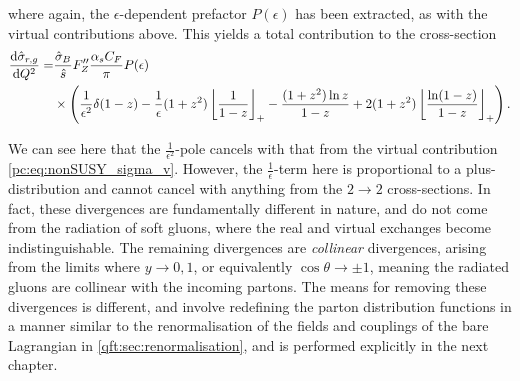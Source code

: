 \documentclass[../main.tex]{subfiles}
\begin{document}
where again, the \(\epsilon\)-dependent prefactor \(P(\epsilon)\) has been extracted, as with the virtual contributions above.
This yields a total contribution to the cross-section
\begin{align}
  \label{pc:eq:sigma_rg}
  \nonumber
  \d[Q^2]{\hat\sigma_{r,g}} = & \frac{\hat\sigma_B}{\hat{s}}  F^{\prime\prime}_Z \frac{\alpha_s C_F}{\pi} P(\epsilon)                                                                                        \\
                              & \times \pclosed{\frac{1}{\epsilon^2} \delta(1-z) - \frac{1}{\epsilon} (1+z^2)\plusdist{\frac{1}{1-z}} - \frac{(1+z^2)\ln z}{1-z} + 2(1+z^2)\plusdist{\frac{\ln(1-z)}{1-z}}}.
\end{align}

We can see here that the \(\frac{1}{\epsilon^2}\)-pole cancels with that from the virtual contribution \cref{pc:eq:nonSUSY_sigma_v}.
However, the \(\frac{1}{\epsilon}\)-term here is proportional to a plus-distribution and cannot cancel with anything from the \(2\to 2\) cross-sections.
In fact, these divergences are fundamentally different in nature, and do not come from the radiation of soft gluons, where the real and virtual exchanges become indistinguishable.
The remaining divergences are \emph{collinear} divergences, arising from the limits where \(y \to 0, 1\), or equivalently \(\cos\theta \to \pm 1\), meaning the radiated gluons are collinear with the incoming partons.
The means for removing these divergences is different, and involve redefining the parton distribution functions in a manner similar to the renormalisation of the fields and couplings of the bare Lagrangian in \cref{qft:sec:renormalisation}, and is performed explicitly in the next chapter.
\end{document}
